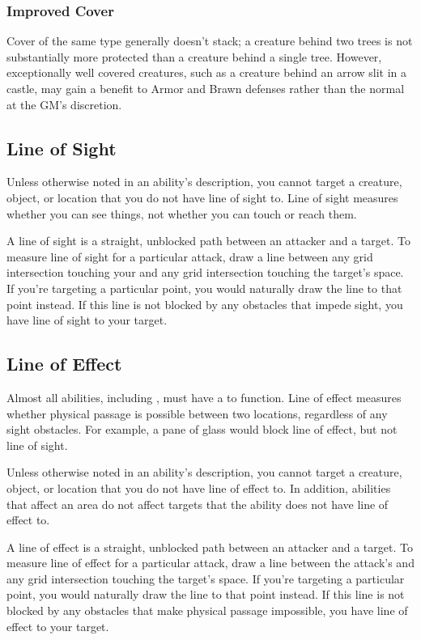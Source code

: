     \subsubsection{Improved Cover}
      Cover of the same type generally doesn't stack; a creature behind two trees is not substantially more protected than a creature behind a single tree.
      However, exceptionally well covered creatures, such as a creature behind an arrow slit in a castle, may gain a  benefit to Armor and Brawn defenses rather than the normal  at the GM's discretion.

  \subsection{Line of Sight}\label{Line of Sight}
    Unless otherwise noted in an ability's description, you cannot target a creature, object, or location that you do not have line of sight to.
    Line of sight measures whether you can see things, not whether you can touch or reach them.

    A line of sight is a straight, unblocked path between an attacker and a target.
    To measure line of sight for a particular attack, draw a line between any grid intersection touching your  and any grid intersection touching the target's space.
    If you're targeting a particular point, you would naturally draw the line to that point instead.
    If this line is not blocked by any obstacles that impede sight, you have line of sight to your target.

  \subsection{Line of Effect}\label{Line of Effect}
    Almost all abilities, including , must have a  to function.
    Line of effect measures whether physical passage is possible between two locations, regardless of any sight obstacles.
    For example, a pane of glass would block line of effect, but not line of sight.

    Unless otherwise noted in an ability's description, you cannot target a creature, object, or location that you do not have line of effect to.
    In addition, abilities that affect an area do not affect targets that the ability does not have line of effect to.

    A line of effect is a straight, unblocked path between an attacker and a target.
    To measure line of effect for a particular attack, draw a line between the attack's  and any grid intersection touching the target's space.
    If you're targeting a particular point, you would naturally draw the line to that point instead.
    If this line is not blocked by any obstacles that make physical passage impossible, you have line of effect to your target.

